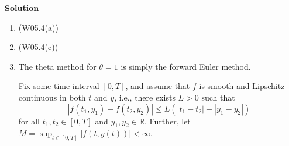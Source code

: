 \documentclass{article}
\begin{document}
\begin{enumerate}
\begin{enumerate}
\end{enumerate}

{\bf Solution}

\begin{enumerate}
\item (W05.4(a))

\item (W05.4(c))

\item The theta method for \(\theta = 1\) is simply the forward Euler method.

Fix some time interval \([0,T]\), and assume that \(f\) is smooth and Lipschitz continuous in both \(t\) and \(y\), i.e., there exists \(L > 0\) such that
\[|f(t_1,y_1) - f(t_2,y_2)| \leq L \left( |t_1 - t_2| + |y_1 - y_2| \right)\]
for all \(t_1,t_2 \in [0,T]\) and \(y_1,y_2 \in \mathbb{R}\).  Further, let \(M = \sup_{t \in [0,T]} |f(t,y(t))| < \infty\).


\end{enumerate}
\end{enumerate}
\end{document}
